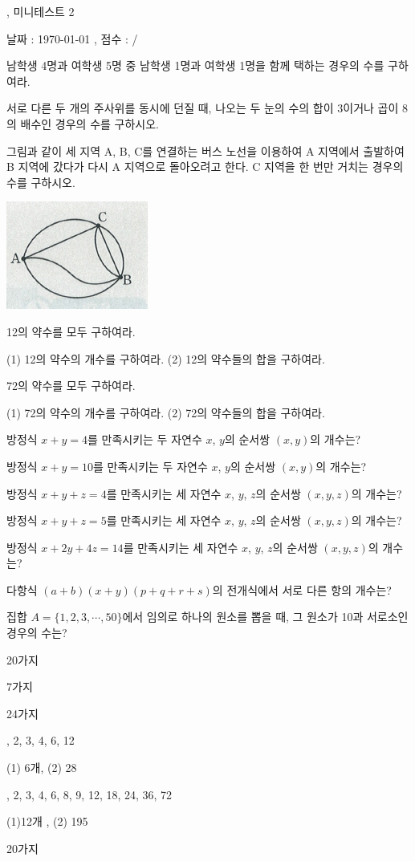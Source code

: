 \documentclass[a4paper]{oblivoir}
\begin{document}
\begin{center}
, 미니테스트 2
\end{center}
\begin{center}
날짜 : \today
,\qquad
점수 :  / 
\end{center}

%
\prob
남학생 4명과 여학생 5명 중 남학생 1명과 여학생 1명을 함께 택하는 경우의 수를 구하여라.

%
\prob
서로 다른 두 개의 주사위를 동시에 던질 때, 나오는 두 눈의 수의 합이 3이거나 곱이 8의 배수인 경우의 수를 구하시오.

%
\prob
그림과 같이 세 지역 A, B, C를 연결하는 버스 노선을 이용하여 A 지역에서 출발하여 B 지역에 갔다가 다시 A 지역으로 돌아오려고 한다.
C 지역을 한 번만 거치는 경우의 수를 구하시오.
\begin{center}
\includegraphics[width=.2\textwidth]{routes}
\end{center}

%
\prob
12의 약수를 모두 구하여라.

%
\prob
(1) 12의 약수의 개수를 구하여라. (2) 12의 약수들의 합을 구하여라.

%
\prob
72의 약수를 모두 구하여라.

%
\prob
(1) 72의 약수의 개수를 구하여라. (2) 72의 약수들의 합을 구하여라.

%
\prob
방정식 \(x+y=4\)를 만족시키는 두 자연수 \(x\), \(y\)의 순서쌍 \((x,y)\)의 개수는?

%
\prob
방정식 \(x+y=10\)를 만족시키는 두 자연수 \(x\), \(y\)의 순서쌍 \((x,y)\)의 개수는?

%
\prob
방정식 \(x+y+z=4\)를 만족시키는 세 자연수 \(x\), \(y\), \(z\)의 순서쌍 \((x,y,z)\)의 개수는?

%
\prob
방정식 \(x+y+z=5\)를 만족시키는 세 자연수 \(x\), \(y\), \(z\)의 순서쌍 \((x,y,z)\)의 개수는?

%
\prob
방정식 \(x+2y+4z=14\)를 만족시키는 세 자연수 \(x\), \(y\), \(z\)의 순서쌍 \((x,y,z)\)의 개수는?

%
\prob
다항식 \((a+b)(x+y)(p+q+r+s)\)의 전개식에서 서로 다른 항의 개수는?

%
\prob
집합 \(A=\{1,2,3,\cdots,50\}\)에서 임의로 하나의 원소를 뽑을 때, 그 원소가 10과 서로소인 경우의 수는?

\newpage
\setcounter{num}{0}

%
\ans
20가지

%
\ans
7가지

%
\ans
24가지

%
, 2, 3, 4, 6, 12

%
\ans
(1) 6개, (2) 28

%
, 2, 3, 4, 6, 8, 9, 12, 18, 24, 36, 72

%
\ans
(1)12개 , (2) 195

%

%

%

%

%
\ans
\one

%
\ans
\five

%
\ans
20가지
\end{document}
